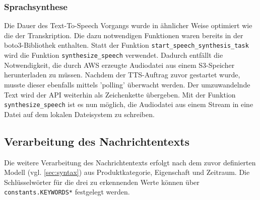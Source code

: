 \subsubsection{Sprachsynthese}

Die Dauer des Text-To-Speech Vorgangs wurde in ähnlicher Weise optimiert wie die der Transkription. Die dazu notwendigen Funktionen waren bereits in der boto3-Bibliothek enthalten. Statt der Funktion \lstinline{start_speech_synthesis_task} wird die Funktion \lstinline{synthesize_speech} verwendet. Dadurch entfällt die Notwendigkeit, die durch AWS erzeugte Audiodatei aus einem S3-Speicher herunterladen zu müssen. Nachdem der TTS-Auftrag zuvor gestartet wurde, musste dieser ebenfalls mittels 'polling' überwacht werden. Der umzuwandelnde Text wird der API weiterhin als Zeichenkette übergeben. Mit der Funktion \lstinline{synthesize_speech} ist es nun möglich, die Audiodatei aus einem Stream in eine Datei auf dem lokalen Dateisystem zu schreiben. 

\subsection{Verarbeitung des Nachrichtentexts}

Die weitere Verarbeitung des Nachrichtentexts erfolgt nach dem zuvor definierten Modell (vgl. \autoref{sec:syntax}) aus Produktkategorie, Eigenschaft und Zeitraum. Die Schlüsselwörter für die drei zu erkennenden Werte können über \lstinline{constants.KEYWORDS*} festgelegt werden.
